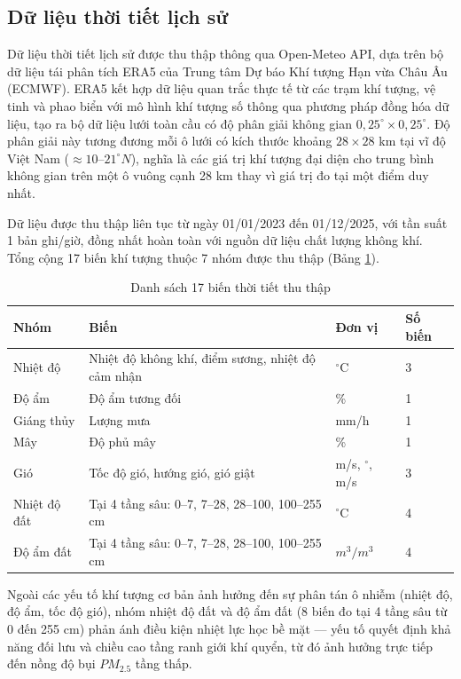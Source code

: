 \subsection{Dữ liệu thời tiết lịch sử}

Dữ liệu thời tiết lịch sử được thu thập thông qua Open-Meteo API, dựa trên bộ dữ liệu tái phân tích ERA5 của Trung tâm Dự báo Khí tượng Hạn vừa Châu Âu (ECMWF). ERA5 kết hợp dữ liệu quan trắc thực tế từ các trạm khí tượng, vệ tinh và phao biển với mô hình khí tượng số thông qua phương pháp đồng hóa dữ liệu, tạo ra bộ dữ liệu lưới toàn cầu có độ phân giải không gian $0{,}25^\circ \times 0{,}25^\circ$. Độ phân giải này tương đương mỗi ô lưới có kích thước khoảng $28 \times 28$ km tại vĩ độ Việt Nam ($\approx 10$--$21^\circ N$), nghĩa là các giá trị khí tượng đại diện cho trung bình không gian trên một ô vuông cạnh 28 km thay vì giá trị đo tại một điểm duy nhất.

Dữ liệu được thu thập liên tục từ ngày 01/01/2023 đến 01/12/2025, với tần suất 1 bản ghi/giờ, đồng nhất hoàn toàn với nguồn dữ liệu chất lượng không khí. Tổng cộng 17 biến khí tượng thuộc 7 nhóm được thu thập (Bảng \ref{tab:bien_thoi_tiet}).

\begin{table}[H]
    \centering
    \caption{Danh sách 17 biến thời tiết thu thập}
    \label{tab:bien_thoi_tiet}
    \renewcommand{\arraystretch}{1.3}
    \begin{tabular}{p{3cm} p{7cm} p{2.5cm} p{1.5cm}}
    \toprule
    \textbf{Nhóm} & \textbf{Biến} & \textbf{Đơn vị} & \textbf{Số biến} \\
    \midrule
    Nhiệt độ & Nhiệt độ không khí, điểm sương, nhiệt độ cảm nhận & $^\circ$C & 3 \\
    Độ ẩm & Độ ẩm tương đối & \% & 1 \\
    Giáng thủy & Lượng mưa & mm/h & 1 \\
    Mây & Độ phủ mây & \% & 1 \\
    Gió & Tốc độ gió, hướng gió, gió giật & m/s, $^\circ$, m/s & 3 \\
    Nhiệt độ đất & Tại 4 tầng sâu: 0--7, 7--28, 28--100, 100--255 cm & $^\circ$C & 4 \\
    Độ ẩm đất & Tại 4 tầng sâu: 0--7, 7--28, 28--100, 100--255 cm & $m^3/m^3$ & 4 \\
    \bottomrule
    \end{tabular}
\end{table}


Ngoài các yếu tố khí tượng cơ bản ảnh hưởng đến sự phân tán ô nhiễm (nhiệt độ, độ ẩm, tốc độ gió), nhóm nhiệt độ đất và độ ẩm đất (8 biến đo tại 4 tầng sâu từ 0 đến 255 cm) phản ánh điều kiện nhiệt lực học bề mặt --- yếu tố quyết định khả năng đối lưu và chiều cao tầng ranh giới khí quyển, từ đó ảnh hưởng trực tiếp đến nồng độ bụi $PM_{2.5}$ tầng thấp.

